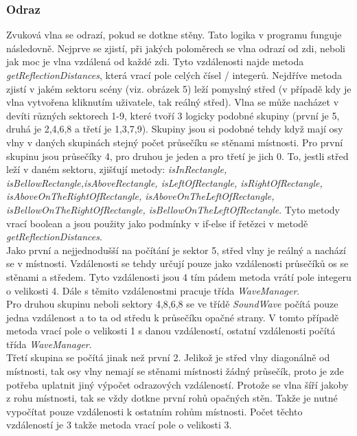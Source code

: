 \subsubsection{Odraz}
Zvuková vlna se odrazí, pokud se dotkne stěny. Tato logika v programu funguje následovně. Nejprve se zjistí, při jakých poloměrech se vlna odrazí od zdi, neboli jak moc je vlna vzdálená od každé zdi. Tyto vzdálenosti najde metoda \textit{getReflectionDistances}, která vrací pole celých čísel / integerů. Nejdříve metoda zjistí v jakém sektoru scény (viz. obrázek 5) leží pomyslný střed (v případě kdy je vlna vytvořena kliknutím uživatele, tak reálný střed). Vlna se může nacházet v devíti různých sektorech 1-9, které tvoří 3 logicky podobné skupiny (první je 5, druhá je 2,4,6,8 a třetí je 1,3,7,9). Skupiny jsou si podobné tehdy když mají osy vlny v daných skupinách stejný počet průsečíku se stěnami místnosti. Pro první skupinu jsou průsečíky 4, pro druhou je jeden a pro třetí je jich 0.
To, jestli střed leží v daném sektoru, zjišťují metody: \textit{isInRectangle, isBellowRectangle,isAboveRectangle, isLeftOfRectangle, isRightOfRectangle, isAboveOnTheRightOfRectangle, isAboveOnTheLeftOfRectangle, isBellowOnTheRightOfRectangle, isBellowOnTheLeftOfRectangle}. Tyto metody vrací boolean a jsou použity jako podmínky v if-else if řetězci v metodě \textit{getReflectionDistances}.\\
Jako první a nejjednodušší na počítání je sektor 5, střed vlny je reálný a nachází se v místnosti. Vzdálenosti se tehdy určují pouze jako vzdálenosti průsečíků os se stěnami a středem. Tyto vzdálenosti jsou 4 tím pádem metoda vrátí pole integeru o velikosti 4. Dále s těmito vzdálenostmi pracuje třída \textit{WaveManager}.\\
Pro druhou skupinu neboli sektory 4,8,6,8 se ve třídě \textit{SoundWave} počítá pouze jedna vzdálenost a to ta od středu k průsečíku opačné strany. V tomto případě metoda vrací pole o velikosti 1 s danou vzdáleností, ostatní vzdálenosti počítá třída \textit{WaveManager}.\\
Třetí skupina se počítá jinak než první 2. Jelikož je střed vlny diagonálně od místnosti, tak osy vlny nemají se stěnami místnosti žádný průsečík, proto je zde potřeba uplatnit jiný výpočet odrazových vzdáleností. Protože se vlna šíří jakoby z rohu místnosti, tak se vždy dotkne první rohů opačných stěn. Takže je nutné vypočítat pouze vzdálenosti k ostatním rohům místnosti. Počet těchto vzdáleností je 3 takže metoda vrací pole o velikosti 3. 

